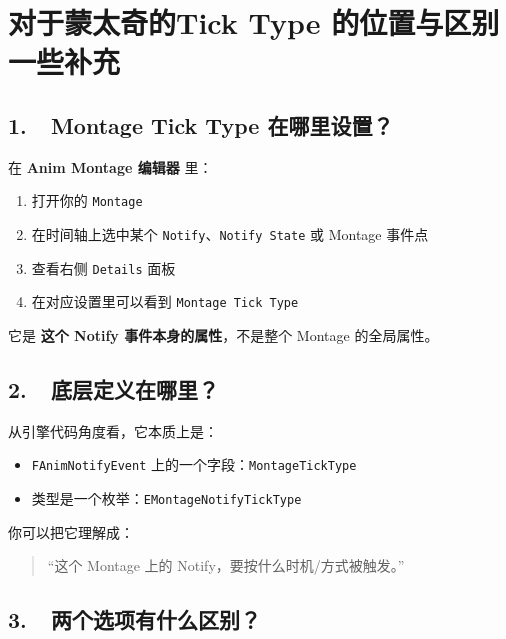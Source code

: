 \section{对于蒙太奇的Tick Type 的位置与区别一些补充}

\subsection*{1.\ \ Montage Tick Type 在哪里设置？}

在 \textbf{Anim Montage 编辑器} 里：

\begin{enumerate}[label=\arabic*.]
	\item 打开你的 \texttt{Montage}
	\item 在时间轴上选中某个 \texttt{Notify}、\texttt{Notify State} 或 Montage 事件点
	\item 查看右侧 \texttt{Details} 面板
	\item 在对应设置里可以看到 \texttt{Montage Tick Type}
\end{enumerate}

它是 \textbf{这个 Notify 事件本身的属性}，不是整个 Montage 的全局属性。

\subsection*{2.\ \ 底层定义在哪里？}

从引擎代码角度看，它本质上是：

\begin{itemize}
	\item \texttt{FAnimNotifyEvent} 上的一个字段：\texttt{MontageTickType}
	\item 类型是一个枚举：\texttt{EMontageNotifyTickType}
\end{itemize}

你可以把它理解成：

\begin{quote}
	“这个 Montage 上的 Notify，要按什么时机/方式被触发。”
\end{quote}

\subsection*{3.\ \ 两个选项有什么区别？}

